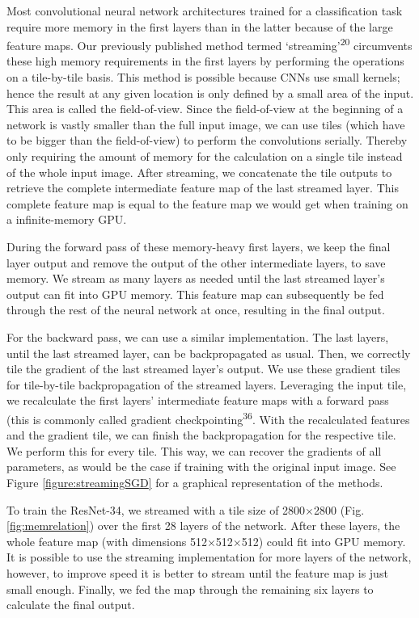 \documentclass[
  12pt,
  a5,margin=2cmpaper,
]{article}
\begin{document}
Most convolutional neural network architectures trained for a
classification task require more memory in the first layers than in the
latter because of the large feature maps. Our previously published
method termed `streaming'\textsuperscript{20} circumvents these high
memory requirements in the first layers by performing the operations on
a tile-by-tile basis. This method is possible because CNNs use small
kernels; hence the result at any given location is only defined by a
small area of the input. This area is called the field-of-view. Since
the field-of-view at the beginning of a network is vastly smaller than
the full input image, we can use tiles (which have to be bigger than the
field-of-view) to perform the convolutions serially. Thereby only
requiring the amount of memory for the calculation on a single tile
instead of the whole input image. After streaming, we concatenate the
tile outputs to retrieve the complete intermediate feature map of the
last streamed layer. This complete feature map is equal to the feature
map we would get when training on a infinite-memory GPU.

During the forward pass of these memory-heavy first layers, we keep the
final layer output and remove the output of the other intermediate
layers, to save memory. We stream as many layers as needed until the
last streamed layer's output can fit into GPU memory. This feature map
can subsequently be fed through the rest of the neural network at once,
resulting in the final output.

For the backward pass, we can use a similar implementation. The last
layers, until the last streamed layer, can be backpropagated as usual.
Then, we correctly tile the gradient of the last streamed layer's
output. We use these gradient tiles for tile-by-tile backpropagation of
the streamed layers. Leveraging the input tile, we recalculate the first
layers' intermediate feature maps with a forward pass (this is commonly
called gradient checkpointing\textsuperscript{36}. With the recalculated
features and the gradient tile, we can finish the backpropagation for
the respective tile. We perform this for every tile. This way, we can
recover the gradients of all parameters, as would be the case if
training with the original input image. See Figure
\protect\hyperlink{figure:streamingSGD}{{[}figure:streamingSGD{]}} for a
graphical representation of the methods.

To train the ResNet-34, we streamed with a tile size of
2800\(\times\)2800 (Fig.
\protect\hyperlink{fig:memrelation}{{[}fig:memrelation{]}}) over the
first 28 layers of the network. After these layers, the whole feature
map (with dimensions 512\(\times\)512\(\times\)512) could fit into GPU
memory. It is possible to use the streaming implementation for more
layers of the network, however, to improve speed it is better to stream
until the feature map is just small enough. Finally, we fed the map
through the remaining six layers to calculate the final output.
\end{document}
